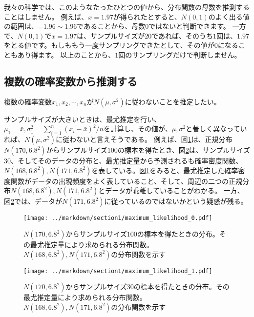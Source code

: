 \documentclass[a4paper,11pt,dvipdfmx]{jsarticle}
\begin{document}
我々の科学では、このようなたったひとつの値から、分布関数の母数を推測することはしません。
例えば、$x=1.97$が得られたとすると、$N(0,1)$のよく出る値の範囲は、$-1.96\sim1.96$であることから、母数$0$ではないと判断できます。
一方で、$N(0,1)$で$x=1.97$は、サンプルサイズが$20$であれば、そのうち$1$回は、$1.97$をとる値です。もしももう一度サンプリングできたとして、その値が$0$になることもあり得ます。
以上のことから、$1$回のサンプリングだけで判断しません。

\subsection{複数の確率変数から推測する}
複数の確率変数$x_1,x_2,\cdots,x_n$が$N(\mu,\sigma^2)$に従わないことを推定したい。

サンプルサイズが大きいときは、最尤推定を行い、$\mu_1=\bar{x},\sigma_1^2=\sum_{i=1}^{n} (x_i-\bar{x})^2/n$を計算し、その値が、$\mu,\sigma^2$と著しく異なっていれば、$N(\mu,\sigma^2)$に従わないと言えそうである。
例えば、図\ref{fig:maximum_likelihood_0}は、正規分布$N(170,6.8^2)$からサンプルサイズ$100$の標本を得たとき、図\ref{fig:maximum_likelihood_1}は、サンプルサイズ$30$、そしてそのデータの分布と、最尤推定量から予測されるも確率密度関数、$N(168,6.8^2),N(171,6.8^2)$を表している。図\ref{fig:maximum_likelihood_0}をみると、最尤推定した確率密度関数がデータの出現頻度をよく表していること、そして、周辺の二つの正規分布$N(168,6.8^2),N(171,6.8^2)$とデータが乖離していることがわかる。
一方、図\ref{fig:maximum_likelihood_1}では、データが$N(171,6.8^2)$に従っているのではないかという疑惑が残る。

\begin{figure}
    \begin{center}
        \texttt{[image: ../markdown/section1/maximum\_likelihood\_0.pdf]}
        \caption{$N(170,6.8^2)$からサンプルサイズ$100$の標本を得たときの分布。その最尤推定量により求められる分布関数。$N(168,6.8^2),N(171,6.8^2)$の分布関数を示す}
        \label{fig:maximum_likelihood_0}
    \end{center}
\end{figure}
\begin{figure}
    \begin{center}
        \texttt{[image: ../markdown/section1/maximum\_likelihood\_1.pdf]}
        \caption{$N(170,6.8^2)$からサンプルサイズ$30$の標本を得たときの分布。その最尤推定量により求められる分布関数。$N(168,6.8^2),N(171,6.8^2)$の分布関数を示す}
        \label{fig:maximum_likelihood_1}
    \end{center}
\end{figure}
\end{document}
